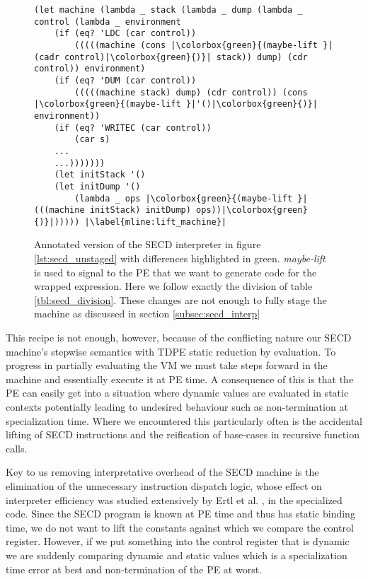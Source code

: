 \documentclass[a4paper,12pt,twoside,openright]{report}
\theoremstyle{definition}
\begin{document}
\begin{figure}[ht]
\centering
\begin{verbatim}
(let machine (lambda _ stack (lambda _ dump (lambda _ control (lambda _ environment
    (if (eq? 'LDC (car control))
        (((((machine (cons |\colorbox{green}{(maybe-lift }|(cadr control)|\colorbox{green}{)}| stack)) dump) (cdr control)) environment)
    (if (eq? 'DUM (car control))
        (((((machine stack) dump) (cdr control)) (cons |\colorbox{green}{(maybe-lift }|'()|\colorbox{green}{)}| environment))
    (if (eq? 'WRITEC (car control))
        (car s)
    ...
    ...)))))))
    (let initStack '()
    (let initDump '()
        (lambda _ ops |\colorbox{green}{(maybe-lift }|(((machine initStack) initDump) ops))|\colorbox{green}{)}|))))) |\label{mline:lift_machine}|
\end{verbatim}
\caption{Annotated version of the SECD interpreter in figure \ref{lst:secd_unstaged} with differences highlighted in green. \textit{maybe-lift} is used to signal to the PE that we want to generate code for the wrapped expression. Here we follow exactly the division of table \ref{tbl:secd_division}. These changes are not enough to fully stage the machine as discussed in section \ref{subsec:secd_interp}}
\label{lst:secd_staged1}
\end{figure}

This recipe is not enough, however, because of the conflicting nature our SECD machine's stepwise semantics with TDPE static reduction by evaluation. To progress in partially evaluating the VM we must take steps forward in the machine and essentially execute it at PE time. A consequence of this is that the PE can easily get into a situation where dynamic values are evaluated in static contexts potentially leading to undesired behaviour such as non-termination at specialization time. Where we encountered this particularly often is the accidental lifting of SECD instructions and the reification of base-cases in recursive function calls.

Key to us removing interpretative overhead of the SECD machine is the elimination of the unnecessary instruction dispatch logic, whose effect on interpreter efficiency was studied extensively by Ertl et al. \cite{ertl2003structure}, in the specialized code. Since the SECD program is known at PE time and thus has static binding time, we do not want to lift the constants against which we compare the control register. However, if we put something into the control register that is dynamic we are suddenly comparing dynamic and static values which is a specialization time error at best and non-termination of the PE at worst.
\end{document}
